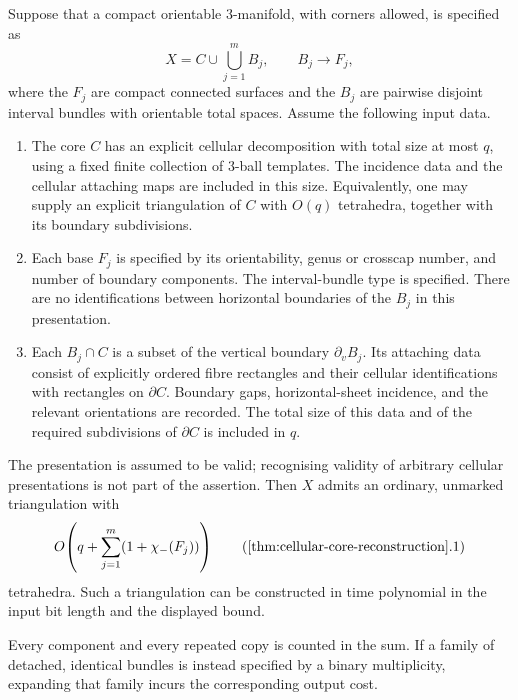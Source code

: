 \begin{theorem}
\label{thm:cellular-core-reconstruction}
Suppose that a compact orientable $3$-manifold, with corners allowed, is
specified as
\[
  X=C\mathbin{\cup}\bigcup_{j=1}^{m}B_j,
  \qquad B_j\longrightarrow F_j,
\]
where the $F_j$ are compact connected surfaces and the $B_j$ are pairwise
disjoint interval bundles with orientable total spaces.  Assume the following
input data.
\begin{enumerate}
  \item The core $C$ has an explicit cellular decomposition with total size
  at most $q$, using a fixed finite collection of $3$-ball templates.  The
  incidence data and the cellular attaching maps are included in this size.
  Equivalently, one may supply an explicit triangulation of $C$ with $O(q)$
  tetrahedra, together with its boundary subdivisions.
  \item Each base $F_j$ is specified by its orientability, genus or crosscap
  number, and number of boundary components.  The interval-bundle type is
  specified.  There are no identifications between horizontal boundaries of
  the $B_j$ in this presentation.
  \item Each $B_j\cap C$ is a subset of the vertical boundary
  $\partial_vB_j$.  Its attaching data consist of explicitly ordered fibre
  rectangles and their cellular identifications with rectangles on
  $\partial C$.  Boundary gaps, horizontal-sheet incidence, and the relevant
  orientations are recorded.  The total size of this data and of the
  required subdivisions of $\partial C$ is included in $q$.
\end{enumerate}
The presentation is assumed to be valid; recognising validity of arbitrary
cellular presentations is not part of the assertion.  Then $X$ admits an
ordinary, unmarked triangulation with
\[
  O\!\left(q+\sum_{j=1}^{m}(1+\chi_-(F_j))\right)
  \tag{\ref{thm:cellular-core-reconstruction}.1}
\]
tetrahedra.  Such a triangulation can be constructed in time polynomial in
the input bit length and the displayed bound.

Every component and every repeated copy is counted in the sum.  If a family
of detached, identical bundles is instead specified by a binary
multiplicity, expanding that family incurs the corresponding output cost.
\end{theorem}

